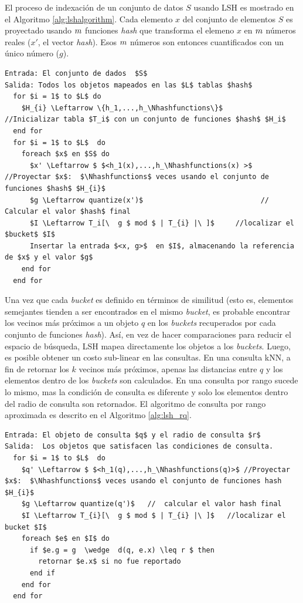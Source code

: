 El proceso de indexación de un conjunto de datos $S$ usando LSH es mostrado en el Algoritmo \ref{alg:lshalgorithm}. Cada elemento $x$ del conjunto de elementos $S$ es proyectado usando   $m$  funciones \textit{hash} que transforma el elemeno $x$ en $m$  números reales ($x'$, el vector \textit{hash}). Esos $m$  números son entonces cuantificados con un único número ($g$).

\begin{lstlisting}[mathescape, frame=single, label=alg:lshalgorithm,caption=Algoritmo de construcción para LSH]
Entrada: El conjunto de dados  $S$
Salida: Todos los objetos mapeados en las $L$ tablas $hash$
  for $i = 1$ to $L$ do
    $H_{i} \Leftarrow \{h_1,...,h_\Nhashfunctions\}$       //Inicializar tabla $T_i$ con un conjunto de funciones $hash$ $H_i$
  end for
  for $i = 1$ to $L$  do
    foreach $x$ en $S$ do
      $x' \Leftarrow $ $<h_1(x),...,h_\Nhashfunctions(x) >$  //Proyectar $x$:  $\Nhashfunctions$ veces usando el conjunto de funciones $hash$ $H_{i}$
      $g \Leftarrow quantize(x')$                            // Calcular el valor $hash$ final
      $I \Leftarrow T_i[\  g $ mod $ | T_{i} |\ ]$     //localizar el $bucket$ $I$
      Insertar la entrada $<x, g>$  en $I$, almacenando la referencia de $x$ y el valor $g$
    end for
  end for
\end{lstlisting}


Una vez que cada \textit{bucket} es definido en términos de similitud (esto es, elementos semejantes tienden a ser encontrados en el mismo \textit{bucket}, es probable encontrar los vecinos más próximos a un objeto $q$ en los \textit{buckets} recuperados por cada conjunto de funciones \textit{hash}). Así, en vez de hacer comparaciones para reducir el espacio de búsqueda, LSH mapea directamente los objetos a los \textit{buckets}. Luego, es posible obtener un costo sub-linear en las consultas. En una consulta kNN, a fin de retornar los $k$ vecinos más próximos, apenas las distancias entre $q$ y los elementos dentro de los \textit{buckets} son calculados. En una consulta por rango sucede lo mismo, mas la condición de consulta es diferente y solo los elementos dentro del radio de consulta son retornados. El algoritmo de consulta por rango aproximada es descrito en el Algoritmo  \ref{alg:lsh_rq}.

\begin{lstlisting}[mathescape, frame=single, label=alg:lsh_rq,caption=Consulta por rango aproximada usando LSH]
Entrada: El objeto de consulta $q$ y el radio de consulta $r$
Salida:  Los objetos que satisfacen las condiciones de consulta.
  for $i = 1$ to $L$  do
    $q' \Leftarrow $ $<h_1(q),...,h_\Nhashfunctions(q)>$ //Proyectar $x$:  $\Nhashfunctions$ veces usando el conjunto de funciones hash $H_{i}$
    $g \Leftarrow quantize(q')$   //  calcular el valor hash final
    $I \Leftarrow T_{i}[\  g $ mod $ | T_{i} |\ ]$   //localizar el bucket $I$
    foreach $e$ en $I$ do
      if $e.g = g  \wedge  d(q, e.x) \leq r $ then
        retornar $e.x$ si no fue reportado
      end if
    end for
  end for
\end{lstlisting}

